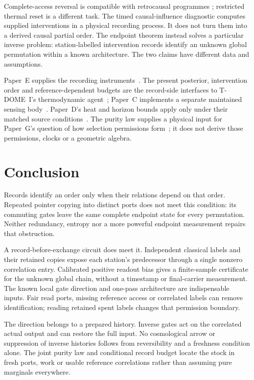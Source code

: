 \documentclass[12pt,a4paper]{article}
\begin{document}
Complete-access reversal is compatible with retrocausal programmes
\cite{Price2012}; restricted thermal reset is a different task.
The timed causal-influence diagnostic computes supplied interventions in
a physical recording process. It does not turn them into a derived
causal partial order. The endpoint theorem instead solves a particular
inverse problem: station-labelled intervention records identify an
unknown global permutation within a known architecture. The two claims
have different data and assumptions.

Paper~E supplies the recording instruments~\cite{Liu2026PaperE}.
The present posterior, intervention order and reference-dependent
budgets are the record-side interfaces to T-DOME~I's thermodynamic
agent~\cite{Liu2026TDOME_I}; Paper~C implements a separate maintained
sensing body~\cite{Liu2026PaperC}. Paper~D's heat and horizon bounds
apply only under their matched source conditions~\cite{Liu2026PaperD}.
The purity law supplies a physical input for Paper~G's question of
how selection permissions form~\cite{Liu2026PaperG}; it does not
derive those permissions, clocks or a geometric algebra.

\section{Conclusion}
\label{sec:conclusion}

Records identify an order only when their relations depend on that
order. Repeated pointer copying into distinct ports does not meet
this condition: its commuting gates leave the same complete endpoint
state for every permutation. Neither redundancy, entropy nor a more
powerful endpoint measurement repairs that obstruction.

A record-before-exchange circuit does meet it. Independent classical
labels and their retained copies expose each station's predecessor
through a single nonzero correlation entry. Calibrated positive readout
bias gives a finite-sample certificate for the unknown global chain,
without a timestamp or final-carrier measurement. The known local
gate direction and one-pass architecture are indispensable inputs.
Fair read ports, missing reference access or correlated labels can
remove identification; reading retained spent labels changes that
permission boundary.

The direction belongs to a prepared history. Inverse gates act on
the correlated actual output and can restore the full input.
No cosmological arrow or suppression of inverse histories follows
from reversibility and a freshness condition alone. The joint purity
law and conditional record budget locate the stock in fresh ports,
work or usable reference correlations rather than assuming pure
marginals everywhere.
\end{document}
